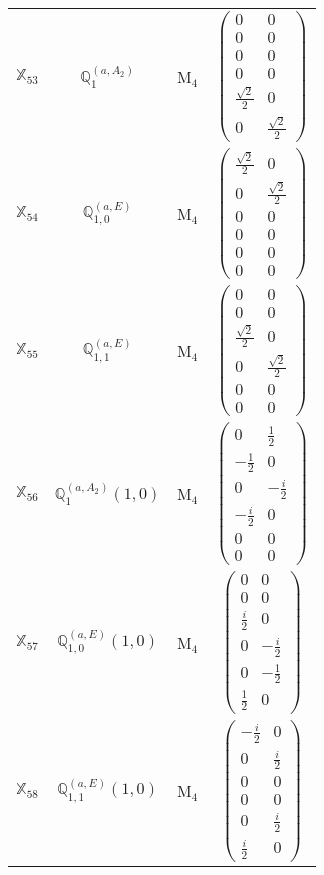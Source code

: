 \documentclass[fleqn,10pt,landscape]{article}
\begin{document}
\begin{itemize}
\begin{center}
\begin{longtable}{c|c|c|c}
$ \mathbb{X}_{53} $ & $\mathbb{Q}_{1}^{(a,A_{2})}$ & M$_{4}$ & $\begin{pmatrix} 0 & 0 \\ 0 & 0 \\ 0 & 0 \\ 0 & 0 \\ \frac{\sqrt{2}}{2} & 0 \\ 0 & \frac{\sqrt{2}}{2} \end{pmatrix}$ \\
$ \mathbb{X}_{54} $ & $\mathbb{Q}_{1,0}^{(a,E)}$ & M$_{4}$ & $\begin{pmatrix} \frac{\sqrt{2}}{2} & 0 \\ 0 & \frac{\sqrt{2}}{2} \\ 0 & 0 \\ 0 & 0 \\ 0 & 0 \\ 0 & 0 \end{pmatrix}$ \\
$ \mathbb{X}_{55} $ & $\mathbb{Q}_{1,1}^{(a,E)}$ & M$_{4}$ & $\begin{pmatrix} 0 & 0 \\ 0 & 0 \\ \frac{\sqrt{2}}{2} & 0 \\ 0 & \frac{\sqrt{2}}{2} \\ 0 & 0 \\ 0 & 0 \end{pmatrix}$ \\
$ \mathbb{X}_{56} $ & $\mathbb{Q}_{1}^{(a,A_{2})}(1,0)$ & M$_{4}$ & $\begin{pmatrix} 0 & \frac{1}{2} \\ - \frac{1}{2} & 0 \\ 0 & - \frac{i}{2} \\ - \frac{i}{2} & 0 \\ 0 & 0 \\ 0 & 0 \end{pmatrix}$ \\
$ \mathbb{X}_{57} $ & $\mathbb{Q}_{1,0}^{(a,E)}(1,0)$ & M$_{4}$ & $\begin{pmatrix} 0 & 0 \\ 0 & 0 \\ \frac{i}{2} & 0 \\ 0 & - \frac{i}{2} \\ 0 & - \frac{1}{2} \\ \frac{1}{2} & 0 \end{pmatrix}$ \\
$ \mathbb{X}_{58} $ & $\mathbb{Q}_{1,1}^{(a,E)}(1,0)$ & M$_{4}$ & $\begin{pmatrix} - \frac{i}{2} & 0 \\ 0 & \frac{i}{2} \\ 0 & 0 \\ 0 & 0 \\ 0 & \frac{i}{2} \\ \frac{i}{2} & 0 \end{pmatrix}$ \\

\end{longtable}
\end{center}
\end{itemize}
\end{document}
